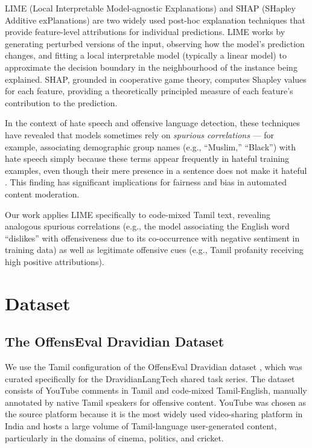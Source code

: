 \documentclass[12pt, a4paper]{article}
\begin{document}
LIME (Local Interpretable Model-agnostic Explanations) \citep{ribeiro2016lime} and SHAP (SHapley Additive exPlanations) \citep{lundberg2017shap} are two widely used post-hoc explanation techniques that provide feature-level attributions for individual predictions. LIME works by generating perturbed versions of the input, observing how the model's prediction changes, and fitting a local interpretable model (typically a linear model) to approximate the decision boundary in the neighbourhood of the instance being explained. SHAP, grounded in cooperative game theory, computes Shapley values for each feature, providing a theoretically principled measure of each feature's contribution to the prediction.

In the context of hate speech and offensive language detection, these techniques have revealed that models sometimes rely on \textit{spurious correlations} --- for example, associating demographic group names (e.g., ``Muslim,'' ``Black'') with hate speech simply because these terms appear frequently in hateful training examples, even though their mere presence in a sentence does not make it hateful \citep{mathew2021hatexplain}. This finding has significant implications for fairness and bias in automated content moderation.

Our work applies LIME specifically to code-mixed Tamil text, revealing analogous spurious correlations (e.g., the model associating the English word ``dislikes'' with offensiveness due to its co-occurrence with negative sentiment in training data) as well as legitimate offensive cues (e.g., Tamil profanity receiving high positive attributions).

\FloatBarrier

\section{Dataset}
\label{sec:dataset}

\subsection{The OffensEval Dravidian Dataset}

We use the Tamil configuration of the OffensEval Dravidian dataset \citep{chakravarthi2021dataset}, which was curated specifically for the DravidianLangTech shared task series. The dataset consists of YouTube comments in Tamil and code-mixed Tamil-English, manually annotated by native Tamil speakers for offensive content. YouTube was chosen as the source platform because it is the most widely used video-sharing platform in India and hosts a large volume of Tamil-language user-generated content, particularly in the domains of cinema, politics, and cricket.
\end{document}

